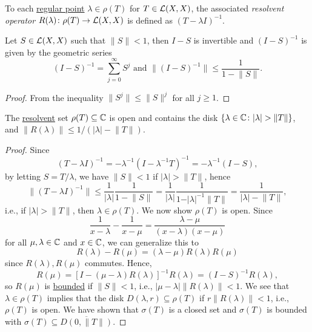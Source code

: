 \begin{definition}\label{def:resolvent-op}
	To each \hyperref[def:regular-point]{regular point} \(\lambda \in \rho (T)\) for \(T\in \mathcal{\MakeUppercase{l}} (X, X)\), the associated \emph{resolvent operator} \(R(\lambda )\colon \rho (T) \to \mathcal{\MakeUppercase{l}} (X, X)\) is defined as \((T-\lambda I)^{-1} \).
\end{definition}

\begin{lemma}
	Let \(S\in \mathcal{\MakeUppercase{l}} (X, X)\) such that \(\lVert S \rVert < 1\), then \(I-S\) is invertible and \((I-S)^{-1} \) is given by the geometric series
	\[
		(I-S)^{-1} = \sum_{j=0} ^{\infty} S^j \text{ and }\lVert (I-S)^{-1} \rVert \leq \frac{1}{1 - \lVert S \rVert} .
	\]
\end{lemma}
\begin{proof}
	From the inequality \(\lVert S^j \rVert \leq \lVert S \rVert ^j\) for all \(j\geq 1\).
\end{proof}

\begin{proposition}\label{prop:lec20-1}
	The \hyperref[def:regular-point]{resolvent} set \(\rho (T)\subseteq \mathbb{\MakeUppercase{c}} \) is open and contains the disk \(\left\{ \lambda \in \mathbb{\MakeUppercase{c}} \colon \vert \lambda  \vert > \lVert T \rVert  \right\} \), and \(\lVert R(\lambda ) \rVert \leq 1 / (\vert \lambda  \vert - \lVert T \rVert )\).
\end{proposition}
\begin{proof}
	Since
	\[
		(T-\lambda I)^{-1}
		= - \lambda ^{-1} (I-\lambda ^{-1} T)^{-1}
		= - \lambda ^{-1} (I-S),
	\]
	by letting \(S = T / \lambda \), we have \(\lVert S \rVert < 1\) if \(\vert \lambda \vert > \lVert T \rVert \), hence
	\[
		\lVert (T-\lambda I)^{-1} \rVert
		\leq \frac{1}{\vert \lambda  \vert } \frac{1}{1 - \lVert S \rVert }
		= \frac{1}{\vert \lambda  \vert } \frac{1}{1 - \vert \lambda  \vert^{-1} \lVert T \rVert  }
		= \frac{1}{\vert \lambda  \vert - \lVert T \rVert },
	\]
	i.e., if \(\vert \lambda  \vert > \lVert T \rVert \), then \(\lambda \in \rho (T)\). We now show \(\rho (T)\) is open. Since
	\[
		\frac{1}{x - \lambda } - \frac{1}{x-\mu } = \frac{\lambda -\mu }{(x-\lambda )(x-\mu )}
	\]
	for all \(\mu , \lambda \in \mathbb{\MakeUppercase{c}} \) and \(x\in \mathbb{\MakeUppercase{c}} \), we can generalize this to
	\[
		R(\lambda ) - R(\mu ) = (\lambda -\mu )R(\lambda )R(\mu )
	\]
	since \(R(\lambda ), R(\mu )\) commutes. Hence,
	\[
		R(\mu )
		= \left[ I-(\mu -\lambda )R(\lambda ) \right] ^{-1} R(\lambda )
		= (I-S)^{-1} R(\lambda ),
	\]
	so \(R(\mu )\) is \hyperref[rmk:bounded-op]{bounded} if \(\lVert S \rVert < 1\), i.e., \(\vert \mu -\lambda  \vert \lVert R(\lambda ) \rVert < 1\). We see that \(\lambda \in \rho (T)\) implies that the disk \(D(\lambda , r) \subseteq \rho (T)\) if \(r \lVert R(\lambda ) \rVert < 1\), i.e., \(\rho (T)\) is open. We have shown that \(\sigma (T)\) is a closed set and \(\sigma (T)\) is bounded with \(\sigma (T) \subseteq \overline{D(0, \lVert T \rVert )}\).
\end{proof}

